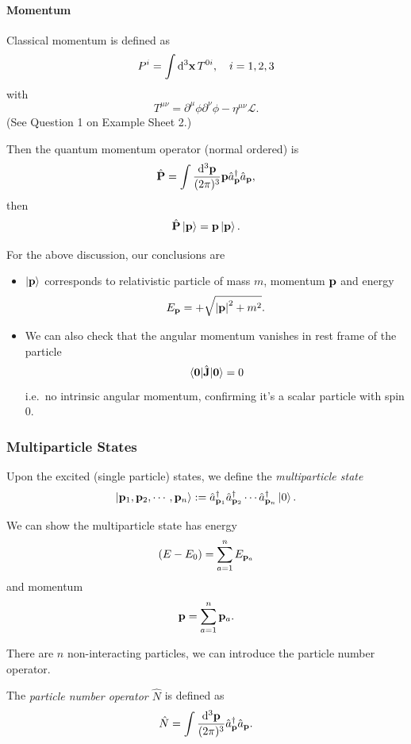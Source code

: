 \documentclass[a4paper,11pt]{article}
\begin{document}
	\paragraph{Momentum}
	Classical momentum is defined as
	\[
		P^i = \int \dd[3]{\vb x} T ^{0i}, \quad i = 1,2,3
	\]
	with 
	\[
		T ^{\mu \nu} = \partial^\mu \phi \partial^\nu \phi - \eta ^{\mu \nu} \mathcal{L}.
	\]
	(See Question 1 on Example Sheet 2.)

	Then the quantum momentum operator (normal ordered) is
	\[
		\hat{\vb P} = \int \frac{\dd[3]{\vb p}}{(2\pi)^{3}} \vb p \hat a^\dagger _{\vb p} \hat a _{\vb p},
	\]
	then
	\[
		\hat{\vb P}\ket{\vb p} = \vb p \ket{\vb p}.
	\]
	
	For the above discussion, our conclusions are
	\begin{itemize}
		\item $\ket{\vb p}$ corresponds to relativistic particle of mass $m$, momentum $\vb p$ and energy \[
			E _{\vb p} = + \sqrt{\abs{\vb p}^2 + m^2}.
		\]
		\item We can also check that the angular momentum vanishes in rest frame of the particle \[
			\mel{\vb 0}{\hat{\vb J}}{\vb 0} = 0
		\]
		i.e.\ no intrinsic angular momentum, confirming it's a scalar particle with spin 0.
	\end{itemize}

	\subsubsection{Multiparticle States}
	\begin{defi}
		Upon the excited (single particle) states, we define the \emph{multiparticle state}
		\[
			\ket{\vb p_1, \vb p_2, \cdots, \vb p_n} := \hat a^\dagger _{\vb p_1} \hat a^\dagger _{\vb p_2} \cdots \hat a^\dagger _{\vb p_n} \ket{0}.
		\]
	\end{defi}

	We can show the multiparticle state has energy
	\[
		(E - E_0) = \sum _{a = 1}^n E _{\vb p_a}
	\]
	and momentum
	\[
		\vb p = \sum _{a = 1}^n \vb p _{a}.
	\]
	
	There are $n$ non-interacting particles, we can introduce the particle number operator.

	\begin{defi}
		The \emph{particle number operator $\hat N$} is defined as 
		\begin{equation}
			\hat N = \int \frac{\dd[3]{\vb p}}{(2\pi)^{3}} \hat a^\dagger _{\vb p} \hat a _{\vb p}.
		\end{equation}
	\end{defi}
	
\end{document}
